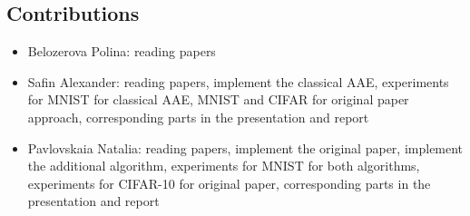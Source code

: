 \documentclass{article}
\begin{document}
    \subsection{Contributions}
    \begin{itemize}
        \item Belozerova Polina: reading papers
        \item Safin Alexander: reading papers,
        implement the classical AAE,
        experiments for MNIST for classical AAE,
        MNIST and CIFAR for original paper approach,
        corresponding parts in the presentation and report
        \item Pavlovskaia Natalia: reading papers,
        implement the original paper,
        implement the additional algorithm,
        experiments for MNIST for both algorithms,
        experiments for CIFAR-10 for original paper,
        corresponding parts in the presentation and report
    \end{itemize}

    
    
\end{document}
